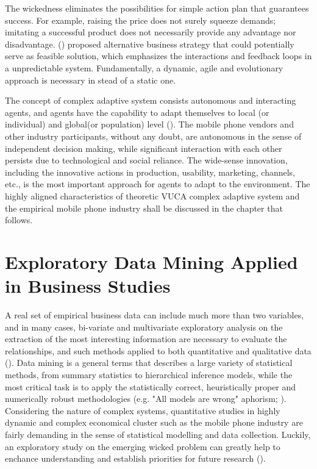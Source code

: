 \documentclass[utf8,english]{gradu3}
\begin{document}
The wickedness eliminates the possibilities for simple action plan that guarantees success. For example, raising the price does not surely squeeze demands; imitating a successful product does not necessarily provide any advantage nor disadvantage. \citeauthor{burnes2005complexity} (\citeyear{burnes2005complexity}) proposed alternative business strategy that could potentially serve as feasible solution, which emphasizes the interactions and feedback loops in a unpredictable system. Fundamentally, a dynamic, agile and evolutionary approach is necessary in stead of a static one.

The concept of complex adaptive system consists autonomous and interacting agents, and agents have the capability to adapt themselves to local (or individual) and global(or population) level (\cite{macal2010tutorial}). The mobile phone vendors and other industry participants, without any doubt, are autonomous in the sense of independent decision making, while significant interaction with each other persists due to technological and social reliance. The wide-sense innovation, including the innovative actions in production, usability, marketing, channels, etc., is the most important approach for agents to adapt to the environment. The highly aligned characteristics of theoretic VUCA complex adaptive system and the empirical mobile phone industry shall be discussed in the chapter that follows. 

\section{Exploratory Data Mining Applied in Business Studies}

A real set of empirical business data can include much more than two variables, and in many cases, bi-variate and multivariate exploratory analysis on the extraction of the most interesting information are necessary to evaluate the relationships, and such methods applied to both quantitative and qualitative data (\cite{giudici2005applied}). Data mining is a general terms that describes a large variety of statistical methods, from summary statistics to hierarchical inference models, while the most critical task is to apply the statistically correct, heuristically proper and numerically robust methodologies (e.g. "All models are wrong" aphorism; \cite{box1979robustness}). Considering the nature of complex systems, quantitative studies in highly dynamic and complex economical cluster such as the mobile phone industry are fairly demanding in the sense of statistical modelling and data collection. Luckily, an exploratory study on the emerging wicked problem can greatly help to enchance understanding and establish priorities for future research (\cite{shields2013playbook}).
\end{document}
